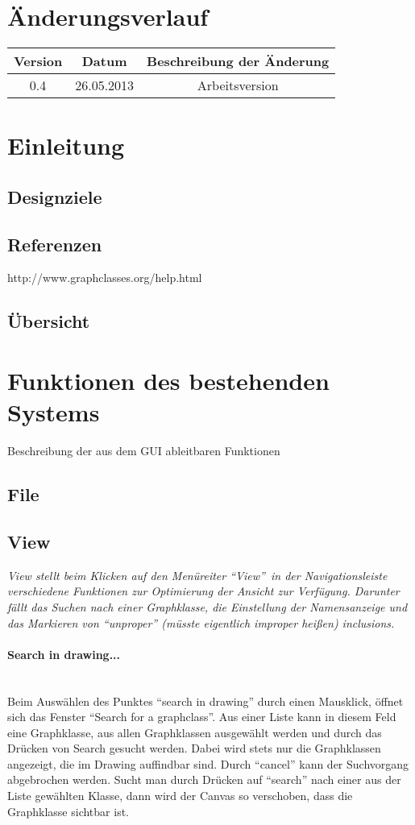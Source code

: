\documentclass[10pt,a4paper]{article}
\begin{document}
\tableofcontents
\section{Änderungsverlauf}
\begin{tabular}{|c|c|c|}\hline
 \textbf{Version}&\textbf{Datum}&\textbf{Beschreibung der \"Anderung}\\\hline
 0.4&26.05.2013&Arbeitsversion\\\hline
\end{tabular}
\section{Einleitung}
\subsection{Designziele}

\subsection{Referenzen}
http://www.graphclasses.org/help.html

\subsection{Übersicht}  
\section{Funktionen des bestehenden Systems}
Beschreibung der aus dem GUI ableitbaren Funktionen
\subsection{File}
\subsection{View}
\emph{View stellt beim Klicken auf den Menüreiter "`View"'\ in der Navigationsleiste verschiedene Funktionen zur Optimierung der Ansicht zur Verfügung. Darunter fällt das Suchen nach einer Graphklasse, die Einstellung der Namensanzeige und das Markieren von "`unproper"' (müsste eigentlich improper heißen) inclusions.}\\

\paragraph{Search in drawing...}\ \\
Beim Auswählen des Punktes "`search in drawing"' durch einen Mausklick, öffnet sich das Fenster "`Search for a graphclass"'. Aus einer Liste kann in diesem Feld eine Graphklasse, aus allen Graphklassen ausgewählt werden und durch das Drücken von Search gesucht werden. Dabei wird stets nur die Graphklassen angezeigt, die im Drawing auffindbar sind. Durch "`cancel"' kann der Suchvorgang abgebrochen werden. Sucht man durch Drücken auf "`search"' nach einer aus der Liste gewählten Klasse, dann wird der Canvas so verschoben, dass die Graphklasse sichtbar ist.
\end{document}
